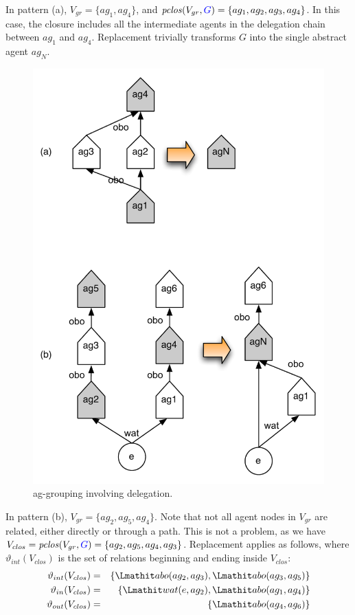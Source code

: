 In pattern (a), $V_{gr} = \{ ag_1, ag_4 \}$, and $\clos(V_{gr},  \jwb{G}) =  \{ ag_1, ag_2, ag_3, ag_4 \}$.
%
In this case, the closure includes all the intermediate agents in the delegation chain between $ag_1$ and $ag_4$.
%
Replacement trivially transforms $G$ into the single abstract agent $ag_N$.


\begin{figure}
\centering
\includegraphics[scale=.5]{figures/d-chains-abstracted}
\caption{ag-grouping involving delegation.}
\label{fig:d-chains-abstracted}
\end{figure}

In pattern (b), $V_{gr} = \{ ag_2, ag_5, ag_4 \}$.
%
Note that not all agent nodes in $V_{gr}$ are related, either directly or through a path. This is not a problem, as we have $V_{clos} = \clos(V_{gr},  \jwb{G}) =   \{ ag_2, ag_5, ag_4, ag_3 \}$. Replacement applies as follows, where $\vartheta_{int}(V_{clos})$ is the set of relations beginning and ending inside $V_{clos}$:
\begin{eqnarray*}
\vartheta_{int}(V_{clos}) & = & \{ \delegate(ag_2, ag_3), \delegate(ag_3, ag_5) \} \\
\vartheta_{in}(V_{clos}) & = & \{ \wat(e, ag_2), \delegate(ag_1, ag_4) \} \\
\vartheta_{out}(V_{clos}) & = & \{ \delegate(ag_4, ag_6) \}
\end{eqnarray*}

